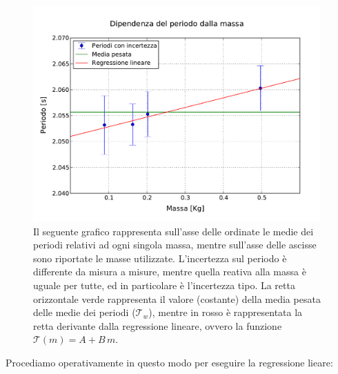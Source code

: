 \begin{figure}
    \centering
    \includegraphics[width=110mm]{immagini/masse.pdf}
    \caption{Il seguente grafico rappresenta sull'asse delle ordinate le medie dei periodi relativi ad ogni
        singola massa, mentre sull'asse delle ascisse sono riportate le masse utilizzate. L'incertezza sul periodo
        è differente da misura a misure, mentre quella reativa alla massa è uguale per tutte, ed in particolare è
        l'incertezza tipo. La retta orizzontale verde rappresenta il valore (costante) della media pesata delle medie
        dei periodi ($\mathcal{T}_w$), mentre in rosso è rappresentata la retta derivante dalla regressione lineare,
        ovvero la funzione $\mathcal{T}(m) = A + B\,m$.}
    \label{fig:masse_periodi}
\end{figure}


Procediamo operativamente in questo modo per eseguire la regressione lieare:

